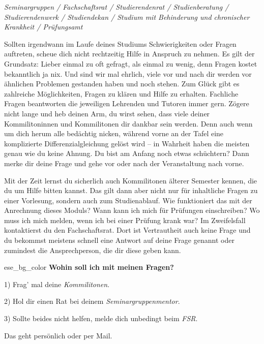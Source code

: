 
\textit{Seminargruppen / Fachschaftsrat / Studierendenrat / Studienberatung / Studierendenwerk / Studiendekan / Studium mit Behinderung und chronischer Krankheit / Prüfungsamt}

Sollten irgendwann im Laufe deines Studiums Schwierigkeiten oder Fragen auftreten, scheue dich nicht rechtzeitig Hilfe in Anspruch zu nehmen.
Es gilt der Grundsatz: Lieber einmal zu oft gefragt, als einmal zu wenig, denn Fragen kostet bekanntlich ja nix. Und sind wir mal ehrlich, viele vor und nach dir werden vor ähnlichen Problemen gestanden haben und noch stehen.
Zum Glück gibt es zahlreiche Möglichkeiten, Fragen zu klären und Hilfe zu erhalten.
Fachliche Fragen beantworten die jeweiligen Lehrenden und Tutoren immer gern. Zögere nicht lange und heb deinen Arm, du wirst sehen, dass viele deiner Kommilitoninnen und Kommilitonen dir dankbar sein werden. Denn auch wenn um dich herum alle bedächtig nicken, während vorne an der Tafel eine komplizierte Differenzialgleichung gelöst wird -- in Wahrheit haben die meisten genau wie du keine Ahnung.
Du bist am Anfang noch etwas schüchtern? Dann merke dir deine Frage und gehe vor oder nach der Veranstaltung nach vorne.

Mit der Zeit lernst du sicherlich auch Kommilitonen älterer Semester kennen, die du um Hilfe bitten kannst.
Das gilt dann aber nicht nur für inhaltliche Fragen zu einer Vorlesung, sondern auch zum Studienablauf.
Wie funktioniert das mit der Anrechnung dieses Moduls? Wann kann ich mich für Prüfungen einschreiben? Wo muss ich mich melden, wenn ich bei einer Prüfung krank war? Im Zweifelsfall kontaktierst du den Fachschaftsrat. Dort ist Vertrautheit auch keine Frage und du bekommst meistens schnell eine Antwort auf deine Frage genannt oder zumindest die Ansprechperson, die dir diese geben kann.

\vfill

\begin{awesomeblock}{2pt}{\faLifeRing[regular]}{ese_bg_color}
    \textbf{Wohin soll ich mit meinen Fragen?}

    1) Frag' mal deine \emph{Kommilitonen}.

    2) Hol dir einen Rat bei deinem \emph{Seminargruppenmentor}.

    3) Sollte beides nicht helfen, melde dich unbedingt beim \emph{FSR}.

    Das geht persönlich oder per Mail.
\end{awesomeblock}


